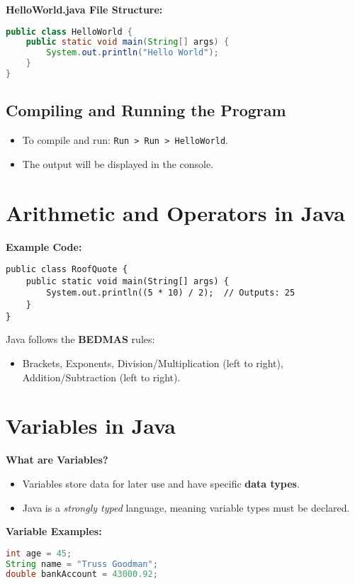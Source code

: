 \documentclass{article}
\begin{document}
\textbf{HelloWorld.java File Structure:}
\begin{lstlisting}[language=java]
public class HelloWorld {
    public static void main(String[] args) {
        System.out.println("Hello World");
    }
}
\end{lstlisting}

\subsection*{Compiling and Running the Program}
\begin{itemize}
    \item To compile and run: \texttt{Run > Run > HelloWorld}.
    \item The output will be displayed in the console.
\end{itemize}

\section{Arithmetic and Operators in Java}
\textbf{Example Code:}
\begin{lstlisting}
public class RoofQuote {
    public static void main(String[] args) {
        System.out.println((5 * 10) / 2);  // Outputs: 25
    }
}
\end{lstlisting}
Java follows the \textbf{BEDMAS} rules:
\begin{itemize}
    \item Brackets, Exponents, Division/Multiplication (left to right), Addition/Subtraction (left to right).
\end{itemize}

\section{Variables in Java}
\textbf{What are Variables?}
\begin{itemize}
    \item Variables store data for later use and have specific \textbf{data types}.
    \item Java is a \emph{strongly typed} language, meaning variable types must be declared.
\end{itemize}

\textbf{Variable Examples:}
\begin{lstlisting}[language=java]
int age = 45;
String name = "Truss Goodman";
double bankAccount = 43000.92;
\end{lstlisting}
\end{document}
